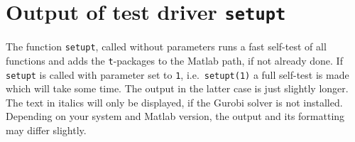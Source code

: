 

\chapter{Output of test driver \texttt{setupt}}
The function \texttt{setupt}, called without parameters runs a fast self-test of all functions and adds the \texttt{t}-packages to the Matlab path, if not already done.
If \texttt{setupt} is called with parameter set to \texttt{1}, i.e.\ \texttt{setupt(1)} a full self-test is made which will take some time. The output in the latter case is just slightly longer. 
The text in italics will only be displayed, if the Gurobi solver is not installed.
Depending on your system and Matlab version, the output and its formatting may differ slightly.
